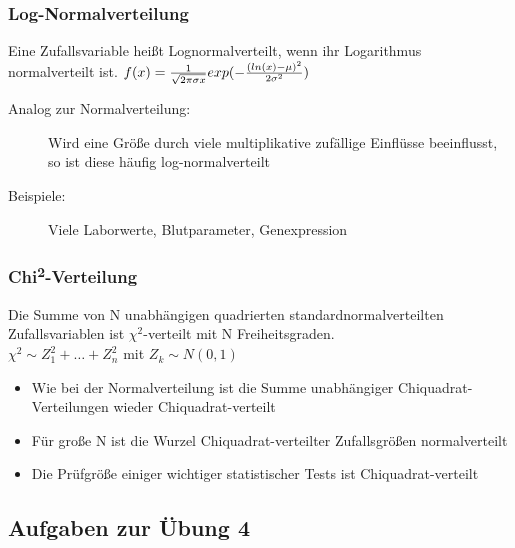 \subsubsection{Log-Normalverteilung}
Eine Zufallsvariable heißt Lognormalverteilt, wenn ihr Logarithmus normalverteilt ist.
$ f(x) = { 1 \over \sqrt{2 \pi \sigma x} } exp(-{(ln(x) - \mu)^2 \over 2 \sigma^2}) $
\begin{description}
    \item[Analog zur Normalverteilung:] Wird eine Größe durch viele multiplikative zufällige Einflüsse beeinflusst, so ist diese häufig log-normalverteilt
    \item[Beispiele:] Viele Laborwerte, Blutparameter, Genexpression
\end{description}

\subsubsection{Chi\textsuperscript{2}-Verteilung}
Die Summe von N unabhängigen quadrierten standardnormalverteilten Zufallsvariablen ist $ \chi^2 $-verteilt mit N Freiheitsgraden. \\
$ \chi^2 \sim Z_1^2 + \dots + Z_n^2 $ mit $ Z_k \sim N(0,1) $
\begin{itemize}
    \item Wie bei der Normalverteilung ist die Summe unabhängiger Chiquadrat-Verteilungen wieder Chiquadrat-verteilt
    \item Für große N ist die Wurzel Chiquadrat-verteilter Zufallsgrößen normalverteilt
    \item Die Prüfgröße einiger wichtiger statistischer Tests ist Chiquadrat-verteilt
\end{itemize}

\subsection{Aufgaben zur Übung 4}
